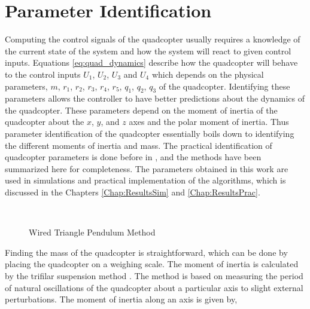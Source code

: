 \documentclass[letterpaper%
, twoside%
, 12pt%
,memoire%
, english%
,creativecommons,hyperref%
]{thETS}
\begin{document}
\section{Parameter Identification} \label{parameter_identification}
Computing the control signals of the quadcopter usually requires a knowledge of the current state of the system and how the system will react to given control inputs. Equations \eqref{eq:quad_dynamics} describe how the quadcopter will behave to the control inputs $U_1$, $U_2$, $U_3$ and $U_4$ which depends on the physical parameters, $m$, $r_1$, $r_2$, $r_3$, $r_4$, $r_5$, $q_1$, $q_2$, $q_3$ of the quadcopter. Identifying these parameters allows the controller to have better predictions about the dynamics of the quadcopter. These parameters depend on the moment of inertia of the quadcopter about the $x$, $y$, and $z$ axes and the polar moment of inertia. 
Thus parameter identification of the quadcopter essentially boils down to identifying the different moments of inertia and mass. The practical identification of quadcopter parameters is done before in \citep{RN121}, and the methods have been summarized here for completeness. The parameters obtained in this work are used in simulations and practical implementation of the algorithms, which is discussed in the Chapters \ref{Chap:ResultsSim} and \ref{Chap:ResultsPrac}.\\
\begin{figure}
	\centering 
	 \\ \parbox{0.75\textwidth}{\caption{Wired Triangle Pendulum Method \citep{RN121}}\label{swm_c2}} 
\end{figure}
Finding the mass of the quadcopter is straightforward, which can be done by placing the quadcopter on a weighing scale. The moment of inertia is calculated by the trifilar suspension method \citep{harris2002harris}. The method is based on measuring the period of natural oscillations of the quadcopter about a particular axis to slight external perturbations. The moment of inertia along an axis is given by, 
\end{document}

